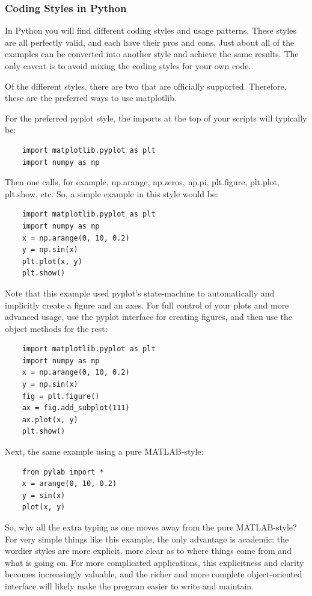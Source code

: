 \subsubsection{Coding Styles in Python}

In Python you will find different coding styles and usage patterns. These styles are all perfectly valid, and each have their pros and cons. Just about all of the examples can be converted into another style and achieve the same results. The only caveat is to avoid mixing the coding styles for your own code.

Of the different styles, there are two that are officially supported. Therefore, these are the preferred ways to use matplotlib.

For the preferred pyplot style, the imports at the top of your scripts will typically be:

\begin{lstlisting}
    import matplotlib.pyplot as plt
    import numpy as np
\end{lstlisting}

Then one calls, for example, np.arange, np.zeros, np.pi, plt.figure, plt.plot, plt.show, etc. So, a simple example in this style would be:

\begin{lstlisting}
    import matplotlib.pyplot as plt
    import numpy as np
    x = np.arange(0, 10, 0.2)
    y = np.sin(x)
    plt.plot(x, y)
    plt.show()
\end{lstlisting}

Note that this example used pyplot's state-machine to automatically and implicitly create a figure and an axes. For full control of your plots and more advanced usage, use the pyplot interface for creating figures, and then use the object methods for the rest:

\begin{lstlisting}
    import matplotlib.pyplot as plt
    import numpy as np
    x = np.arange(0, 10, 0.2)
    y = np.sin(x)
    fig = plt.figure()
    ax = fig.add_subplot(111)
    ax.plot(x, y)
    plt.show()
\end{lstlisting}

Next, the same example using a pure MATLAB-style:

\begin{lstlisting}
    from pylab import *
    x = arange(0, 10, 0.2)
    y = sin(x)
    plot(x, y)
\end{lstlisting}

So, why all the extra typing as one moves away from the pure MATLAB-style? For very simple things like this example, the only advantage is academic: the wordier styles are more explicit, more clear as to where things come from and what is going on. For more complicated applications, this explicitness and clarity becomes increasingly valuable, and the richer and more complete object-oriented interface will likely make the program easier to write and maintain.

